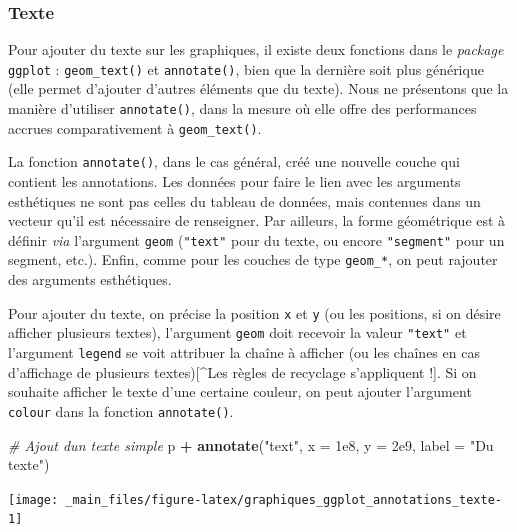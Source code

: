 \documentclass[
  11pt,
]{book}
\newenvironment{Shaded}{\begin{snugshade}}{\end{snugshade}}
\newcommand{\CommentTok}[1]{\textcolor[rgb]{0.56,0.35,0.01}{\textit{#1}}}
\newcommand{\DataTypeTok}[1]{\textcolor[rgb]{0.13,0.29,0.53}{#1}}
\newcommand{\FloatTok}[1]{\textcolor[rgb]{0.00,0.00,0.81}{#1}}
\newcommand{\KeywordTok}[1]{\textcolor[rgb]{0.13,0.29,0.53}{\textbf{#1}}}
\newcommand{\NormalTok}[1]{#1}
\newcommand{\OperatorTok}[1]{\textcolor[rgb]{0.81,0.36,0.00}{\textbf{#1}}}
\newcommand{\StringTok}[1]{\textcolor[rgb]{0.31,0.60,0.02}{#1}}
\numberwithin{equation}{section}
\numberwithin{countremarque}{section}
\begin{document}
\hypertarget{graphiques_ggplot_annotations_texte}{%
\subsubsection{Texte}\label{graphiques_ggplot_annotations_texte}}

Pour ajouter du texte sur les graphiques, il existe deux fonctions dans le \emph{package} \texttt{ggplot} : \texttt{geom\_text()} et \texttt{annotate()}, bien que la dernière soit plus générique (elle permet d'ajouter d'autres éléments que du texte). Nous ne présentons que la manière d'utiliser \texttt{annotate()}, dans la mesure où elle offre des performances accrues comparativement à \texttt{geom\_text()}.

La fonction \texttt{annotate()}, dans le cas général, créé une nouvelle couche qui contient les annotations. Les données pour faire le lien avec les arguments esthétiques ne sont pas celles du tableau de données, mais contenues dans un vecteur qu'il est nécessaire de renseigner. Par ailleurs, la forme géométrique est à définir \emph{via} l'argument \texttt{geom} (\texttt{"text"} pour du texte, ou encore \texttt{"segment"} pour un segment, etc.). Enfin, comme pour les couches de type \texttt{geom\_*}, on peut rajouter des arguments esthétiques.

Pour ajouter du texte, on précise la position \texttt{x} et \texttt{y} (ou les positions, si on désire afficher plusieurs textes), l'argument \texttt{geom} doit recevoir la valeur \texttt{"text"} et l'argument \texttt{legend} se voit attribuer la chaîne à afficher (ou les chaînes en cas d'affichage de plusieurs textes){[}\^{}Les règles de recyclage s'appliquent !{]}. Si on souhaite afficher le texte d'une certaine couleur, on peut ajouter l'argument \texttt{colour} dans la fonction \texttt{annotate()}.

\begin{Shaded}
\begin{Highlighting}[]
\CommentTok{\# Ajout d\textquotesingle{}un texte simple}
\NormalTok{p }\OperatorTok{+}\StringTok{ }\KeywordTok{annotate}\NormalTok{(}\StringTok{"text"}\NormalTok{, }\DataTypeTok{x =} \FloatTok{1e8}\NormalTok{, }\DataTypeTok{y =} \FloatTok{2e9}\NormalTok{, }\DataTypeTok{label =} \StringTok{"Du texte"}\NormalTok{)}
\end{Highlighting}
\end{Shaded}

\begin{center}\texttt{[image: \_main\_files/figure-latex/graphiques\_ggplot\_annotations\_texte-1]} \end{center}
\end{document}
